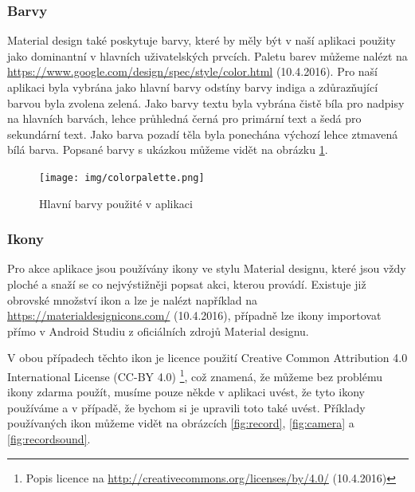 \documentclass[czech,master,public,dept460,male,java,cpdeclaration]{diploma}
\begin{document}
\subsubsection{Barvy}
  Material design také poskytuje barvy, které by měly být v naší aplikaci použity jako dominantní v hlavních
  uživatelských prvcích. Paletu barev můžeme nalézt na \url{https://www.google.com/design/spec/style/color.html}  (10.4.2016).
  Pro naší aplikaci byla vybrána jako hlavní barvy odstíny barvy indiga a zdůrazňující barvou byla zvolena zelená.
  Jako barvy textu byla vybrána čistě bíla pro nadpisy na hlavních barvách, lehce průhledná černá pro
  primární text a šedá pro sekundární text. Jako barva pozadí těla byla ponechána výchozí lehce ztmavená bílá
  barva. Popsané barvy s ukázkou můžeme vidět na obrázku \ref{fig:colorpalette}.

  \begin{figure}[H]
          \centering
                  \texttt{[image: img/colorpalette.png]}
          \caption{Hlavní barvy použité v aplikaci}
          \label{fig:colorpalette}
  \end{figure}

\subsubsection{Ikony}
Pro akce aplikace jsou používány ikony ve stylu Material designu, které jsou vždy ploché
a snaží se co nejvýstižněji popsat akci, kterou provádí. Existuje již obrovské množství
ikon a lze je nalézt například na \url{https://materialdesignicons.com/}  (10.4.2016), případně lze ikony
importovat přímo v Android Studiu z oficiálních zdrojů Material designu.

V obou případech těchto ikon je licence použití Creative Common Attribution 4.0 International License (CC-BY 4.0)
\footnote{Popis licence na \url{http://creativecommons.org/licenses/by/4.0/}  (10.4.2016)}, což znamená,
že můžeme bez problému ikony zdarma použít, musíme pouze někde v aplikaci uvést, že tyto ikony
používáme a v případě, že bychom si je upravili toto také uvést.
Příklady používaných ikon můžeme vidět na obrázcích \ref{fig:record}, \ref{fig:camera} a \ref{fig:recordsound}.
\end{document}
